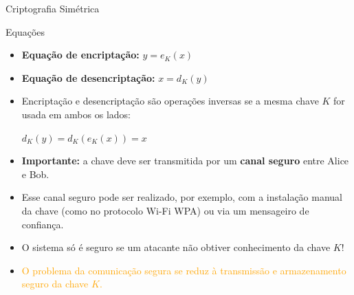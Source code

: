 \documentclass{beamer}
\begin{document}
\begin{frame}{Criptografia Simétrica}
\vspace{-0.5em}
\begin{block}{Equações}
\begin{itemize}
    \item \textbf{Equação de encriptação:} \quad $y = e_K(x)$
    \item \textbf{Equação de desencriptação:} \quad $x = d_K(y)$
\end{itemize}
\end{block}

\vspace{0.5em}
\begin{itemize}
    \item Encriptação e desencriptação são operações inversas se a mesma chave $K$ for usada em ambos os lados: \\
    \begin{center}
        $ d_K(y) = d_K(e_K(x)) = x $    
    \end{center}
    
    \item \textbf{Importante:} a chave deve ser transmitida por um \textbf{canal seguro} entre Alice e Bob.

    \item Esse canal seguro pode ser realizado, por exemplo, com a instalação manual da chave (como no protocolo Wi-Fi WPA) ou via um mensageiro de confiança.

    \item O sistema só é seguro se um atacante não obtiver conhecimento da chave $K$!

    \item[\textcolor{orange}{$\Rightarrow$}] \textcolor{orange}{O problema da comunicação segura se reduz à transmissão e armazenamento seguro da chave $K$.}
\end{itemize}
\end{frame}



\end{document}
